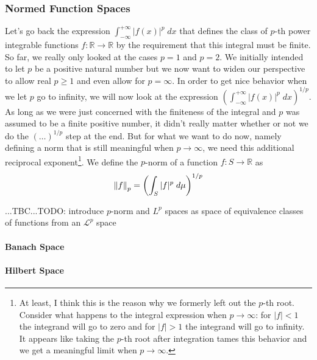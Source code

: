 \subsubsection{Normed Function Spaces}
Let's go back the expression $\int_{-\infty}^{+\infty} |f(x)|^p \; dx$ that defines the class of $p$-th power integrable functions $f: \mathbb{R} \rightarrow \mathbb{R}$ by the requirement that this integral must be finite. So far, we really only looked at the cases $p=1$ and $p=2$. We initially intended to let $p$ be a positive natural number but we now want to widen our perspective to allow real $p \geq 1$ and even allow for $p = \infty$. In order to get nice behavior when we let $p$ go to infinity, we will now look at the expression $(\int_{-\infty}^{+\infty} |f(x)|^p \; dx)^{1/p}$. As long as we were just concerned with the finiteness of the integral and $p$ was assumed to be a finite positive number, it didn't really matter whether or not we do the $(\ldots)^{1/p}$ step at the end. But for what we want to do now, namely defining a norm that is still meaningful when $p \rightarrow \infty$, we need this additional reciprocal exponent\footnote{At least, I think this is the reason why we formerly left out the $p$-th root. Consider what happens to the integral expression when $p \rightarrow \infty$: for $|f| < 1$ the integrand will go to zero and for $|f| > 1$ the integrand will go to infinity. It appears like taking the $p$-th root after integration tames this behavior and we get a meaningful limit when $p \rightarrow \infty$.}. We define the $p$-norm of a function $f: S \rightarrow \mathbb{R}$ as
\begin{equation}
 \left\lVert f\right\rVert_p = \left( \int_S |f|^p \; d\mu \right)^{1/p}
\end{equation}


 ...TBC...TODO: introduce $p$-norm and $L^p$ spaces as space of equivalence classes of functions from an $\mathcal{L}^p$ space



\paragraph{Banach Space}


\paragraph{Hilbert Space}

